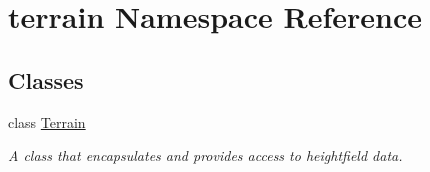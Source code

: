 \hypertarget{namespaceterrain}{}\section{terrain Namespace Reference}
\label{namespaceterrain}
\subsection*{Classes}
\begin{DoxyCompactItemize}
\item 
class \hyperlink{classterrain_1_1_terrain}{Terrain}
\begin{DoxyCompactList}\small\item\em A class that encapsulates and provides access to heightfield data. \end{DoxyCompactList}\end{DoxyCompactItemize}
